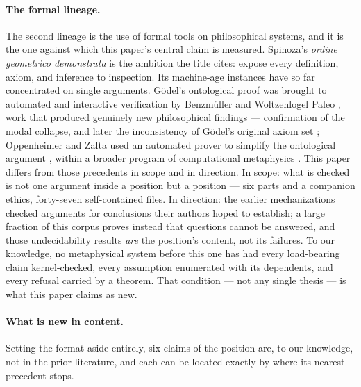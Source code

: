 \documentclass[11pt]{article}
\theoremstyle{remark}
\begin{document}
\paragraph{The formal lineage.} The second lineage is the use of formal tools on philosophical systems, and it is the one against which this paper's central claim is measured. Spinoza's \emph{ordine geometrico demonstrata} \cite{spinoza1677} is the ambition the title cites: expose every definition, axiom, and inference to inspection. Its machine-age instances have so far concentrated on single arguments. G\"odel's ontological proof \cite{godel1995} was brought to automated and interactive verification by Benzm\"uller and Woltzenlogel Paleo \cite{benzmuller2014}, work that produced genuinely new philosophical findings --- confirmation of the modal collapse, and later the inconsistency of G\"odel's original axiom set \cite{benzmuller2016}; Oppenheimer and Zalta used an automated prover to simplify the ontological argument \cite{oppenheimerzalta2011}, within a broader program of computational metaphysics \cite{fitelsonzalta2007}. This paper differs from those precedents in scope and in direction. In scope: what is checked is not one argument inside a position but a position --- six parts and a companion ethics, forty-seven self-contained files. In direction: the earlier mechanizations checked arguments for conclusions their authors hoped to establish; a large fraction of this corpus proves instead that questions cannot be answered, and those undecidability results \emph{are} the position's content, not its failures. To our knowledge, no metaphysical system before this one has had every load-bearing claim kernel-checked, every assumption enumerated with its dependents, and every refusal carried by a theorem. That condition --- not any single thesis --- is what this paper claims as new.

\paragraph{What is new in content.} Setting the format aside entirely, six claims of the position are, to our knowledge, not in the prior literature, and each can be located exactly by where its nearest precedent stops.
\end{document}
